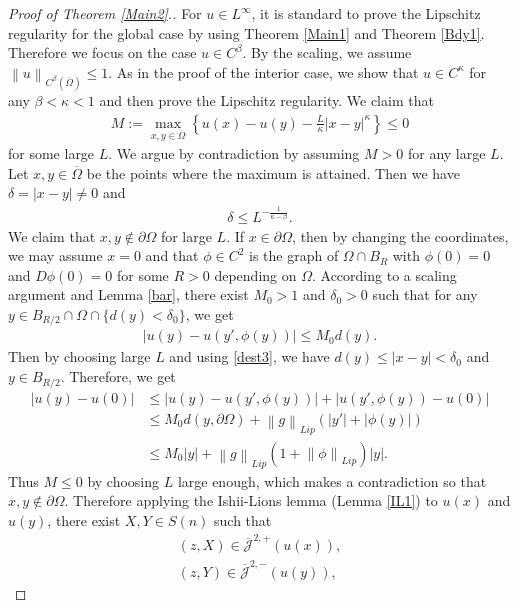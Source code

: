\documentclass[reqno]{amsart}
\theoremstyle{plain}
\theoremstyle{definition}
\theoremstyle{remark}
\newcommand{\norm}[1]{\left\lVert#1\right\rVert}
\numberwithin{equation}{section}
\begin{document}
\begin{proof}[Proof of Theorem \ref{Main2}.]
For $u \in L^\infty$, it is standard to prove the Lipschitz regularity for the global case by using Theorem \ref{Main1} and Theorem \ref{Bdy1}.
Therefore we focus on the case $u \in C^\beta$.
By the scaling, we assume $\norm{u}_{C^\beta(\overline{\Omega})} \leq 1$.
As in the proof of the interior case, we show that $u \in C^\kappa$ for any $\beta<\kappa<1$ and then prove the Lipschitz regularity. We claim that 
    \begin{align} \label{gloish}
        M:= \max_{x,y\in \overline{\Omega}} \left\{ u(x) - u(y) - \frac{L}{\kappa}|x-y|^\kappa \right\} \leq 0
    \end{align}
for some large $L$.
We argue by contradiction by assuming $M>0$ for any large $L$.
Let $x,y \in \overline{\Omega}$ be the points where the maximum is attained.
Then we have $\delta=|x-y|\neq0$ and
\begin{align} \label{dest3}
    \delta \leq L^{-\frac{1}{\kappa-\beta}}.
\end{align}
We claim that $x,y \notin \partial\Omega$ for large $L$. If $x \in \partial\Omega$, then by changing the coordinates, we may assume $x=0$ and that $\phi\in C^2$ is the graph of $\Omega \cap B_R$ with $\phi(0)=0$ and $D\phi(0) =0$ for some $R>0$ depending on $\Omega$.
According to a scaling argument and Lemma \ref{bar}, there exist $M_0>1$ and $\delta_0>0$ such that for any $y \in B_{R/2}\cap\Omega \cap \{d(y) < \delta_0\}$, we get
\begin{align*}
    |u(y)-u(y',\phi(y))|\leq M_0 d(y).
\end{align*}
Then by choosing large $L$ and using \eqref{dest3}, we have $d(y) \leq |x-y| < \delta_0$ and $y \in B_{R/2}$.
Therefore, we get
\begin{align*}
    |u(y)-u(0)| &\leq |u(y)-u(y',\phi(y))| + |u(y',\phi(y))-u(0)| \\
    &\leq M_0d(y,\partial\Omega) + \norm{g}_{Lip}(|y'| +|\phi(y)|) \\
    &\leq M_0|y| + \norm{g}_{Lip}(1+\norm{\phi}_{Lip})|y|.
\end{align*}
Thus $M\leq0$ by choosing $L$ large enough, which makes a contradiction so that $x,y \notin \partial\Omega$.
Therefore applying the Ishii-Lions lemma (Lemma \ref{IL1}) to $u(x)$ and $u(y)$, there exist $X,Y \in S(n)$ such that
\begin{align*}
    (z, X)\in \overline{\mathcal{J}}^{2,+} \left( u(x)\right), \\
    (z, Y)\in \overline{\mathcal{J}}^{2,-} \left( u(y)\right),

\end{align*}
\end{proof}
\end{document}
